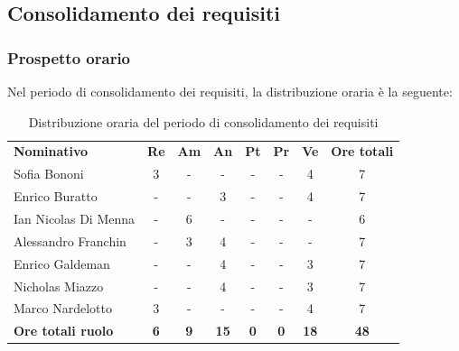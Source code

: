 \documentclass[../piano-di-progetto.tex]{subfiles}
\begin{document}
  \subsection{Consolidamento dei requisiti}

  \subsubsection{Prospetto orario}
  Nel periodo di consolidamento dei requisiti, la distribuzione oraria è la seguente:
  \begin{table}[H]
    \centering
    \begin{tabular}{lccccccc}
      \rowcolor{lightgray}
      \textbf{Nominativo}        & \textbf{Re} & \textbf{Am}  & \textbf{An} & \textbf{Pt}  & \textbf{Pr}   & \textbf{Ve} & \textbf{Ore totali} \\
      Sofia Bononi              & 3          & -          & -           & -          & -          & 4           & 7           \\
      Enrico Buratto            & -          & -          & 3           & -          & -          & 4           & 7           \\
      Ian Nicolas Di Menna      & -          & 6          & -           & -          & -          & -           & 6           \\
      Alessandro Franchin       & -          & 3          & 4           & -          & -          & -           & 7           \\
      Enrico Galdeman           & -          & -          & 4           & -          & -          & 3           & 7           \\
      Nicholas Miazzo           & -          & -          & 4           & -          & -          & 3           & 7           \\
      Marco Nardelotto          & 3          & -          & -           & -          & -          & 4           & 7           \\
      \textbf{Ore totali ruolo} & \textbf{6} & \textbf{9} & \textbf{15} & \textbf{0} & \textbf{0} & \textbf{18} & \textbf{48}
      
    \end{tabular}
    \caption{Distribuzione oraria del periodo di consolidamento dei requisiti}
  \end{table}
\end{document}

